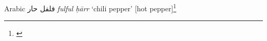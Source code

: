 \begin{etymology}\label{ety:fulful harr}
Arabic {فلفل حار } \textit{fulful ḥārr} `chili pepper' [hot pepper]\footnote{\textcite{wehr_dictionary_1976}}
\end{etymology}